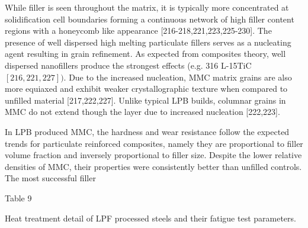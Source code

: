 \documentclass[10pt]{article}
\begin{document}
While filler is seen throughout the matrix, it is typically more concentrated at solidification cell boundaries forming a continuous network of high filler content regions with a honeycomb like appearance [216-218,221,223,225-230]. The presence of well dispersed high melting particulate fillers serves as a nucleating agent resulting in grain refinement. As expected from composites theory, well dispersed nanofillers produce the strongest effects (e.g. 316 L-15TiC $[216,221,227])$. Due to the increased nucleation, MMC matrix grains are also more equiaxed and exhibit weaker crystallographic texture when compared to unfilled material [217,222,227]. Unlike typical LPB builds, columnar grains in MMC do not extend though the layer due to increased nucleation [222,223].

In LPB produced MMC, the hardness and wear resistance follow the expected trends for particulate reinforced composites, namely they are proportional to filler volume fraction and inversely proportional to filler size. Despite the lower relative densities of MMC, their properties were consistently better than unfilled controls. The most successful filler

Table 9

Heat treatment detail of LPF processed steels and their fatigue test parameters.
\end{document}
